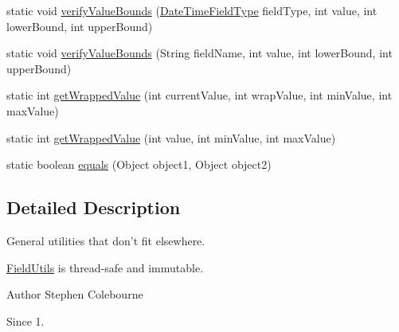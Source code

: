 \begin{DoxyCompactItemize}
\item 
static void \hyperlink{classorg_1_1joda_1_1time_1_1field_1_1_field_utils_a8a100306f630846be797554d3d093b56}{verify\-Value\-Bounds} (\hyperlink{classorg_1_1joda_1_1time_1_1_date_time_field_type}{Date\-Time\-Field\-Type} field\-Type, int value, int lower\-Bound, int upper\-Bound)
\item 
static void \hyperlink{classorg_1_1joda_1_1time_1_1field_1_1_field_utils_a4f5655d95f607aff8b8a105047f0c539}{verify\-Value\-Bounds} (String field\-Name, int value, int lower\-Bound, int upper\-Bound)
\item 
static int \hyperlink{classorg_1_1joda_1_1time_1_1field_1_1_field_utils_a9d96c39461bfb32c4f67fe8f833c2f00}{get\-Wrapped\-Value} (int current\-Value, int wrap\-Value, int min\-Value, int max\-Value)
\item 
static int \hyperlink{classorg_1_1joda_1_1time_1_1field_1_1_field_utils_a6a074abd36c5c8c0a230dbcc547d9d12}{get\-Wrapped\-Value} (int value, int min\-Value, int max\-Value)
\item 
static boolean \hyperlink{classorg_1_1joda_1_1time_1_1field_1_1_field_utils_a8a9e95e10da57bea59b31b295788c5f9}{equals} (Object object1, Object object2)
\end{DoxyCompactItemize}


\subsection{Detailed Description}
General utilities that don't fit elsewhere. 

\hyperlink{classorg_1_1joda_1_1time_1_1field_1_1_field_utils}{Field\-Utils} is thread-\/safe and immutable.

\begin{DoxyAuthor}{Author}
Stephen Colebourne 
\end{DoxyAuthor}
\begin{DoxySince}{Since}
1. 
\end{DoxySince}



